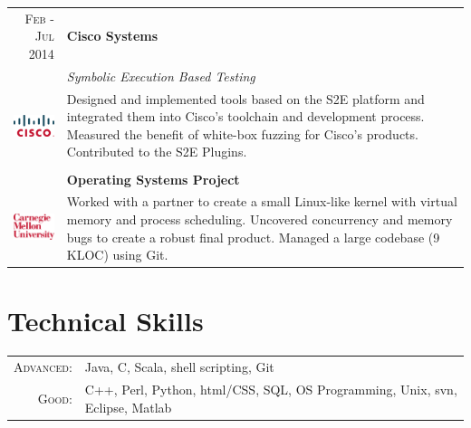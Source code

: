 \documentclass[a4paper,11pt]{article} %
\begin{document}
\begin{tabularx}{\textwidth}{r|X}

\textsc{Feb - Jul 2014} & \textbf{Cisco Systems} \\
\multirow{4}{*}{ \includegraphics[width=60pt]{img/cisco.eps}}
& \emph{Symbolic Execution Based Testing}\\ 
& \footnotesize{Designed and implemented tools based on the S2E platform and
integrated them into Cisco's toolchain and development process. Measured the
benefit of white-box fuzzing for Cisco's products. Contributed to the S2E
Plugins.}\\
\multicolumn{2}{c}{} \\


\textsc{Jan - May 2013} & \textbf{Operating Systems Project}\\
\multirow{3}{*}{ \includegraphics[width=55pt]{img/cmu.eps}}
& \footnotesize{Worked with a partner to create a small Linux-like kernel
with virtual memory and process scheduling. Uncovered concurrency and memory
bugs to create a robust final product. Managed a large codebase (9 KLOC) using Git.}\\
\end{tabularx}


\section{Technical Skills}
\begin{center}
\begin{tabular}{rl}
\textsc{\large{Advanced}}: & Java, C, Scala, shell scripting, Git\\
\textsc{\large{Good}}: & C++, Perl, Python, html/CSS, SQL, OS Programming, Unix, svn, Eclipse, Matlab\\
\end{tabular}
\end{center}
\end{document}
